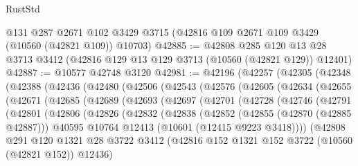 \begin{lexlean}{RustStd}
\begin{coremodule}
    @131
    @287
    @2671
    @102
    @3429
    @3715
    (@42816 @109 @2671 @109 @3429 (@10560 (@42821 @109)) @10703)
@42885 := @42808
    @285
    @120
    @13
    @28
    @3713
    @3412
    (@42816 @129 @13 @129 @3713 (@10560 (@42821 @129)) @12401)
@42887 := @10577 @42748 @3120
@42981 := @42196
    (@42257
      (@42305
        (@42348
          (@42388
            (@42436
              (@42480
                (@42506
                  (@42543
                    (@42576
                      (@42605
                        (@42634
                          (@42655
                            (@42671
                              (@42685
                                (@42689
                                  (@42693
                                    (@42697
                                      (@42701
                                        (@42728
                                          (@42746
                                            (@42791
                                              (@42801
                                                (@42806
                                                  (@42826
                                                    (@42832
                                                      (@42838
                                                        (@42852
                                                          (@42855 (@42870 (@42885 @42887)))
                                                          @40595
                                                          @10764
                                                          @12413
                                                          (@10601 (@12415 @9223 @3418))))
                                                      (@42808
                                                        @291
                                                        @120
                                                        @1321
                                                        @28
                                                        @3722
                                                        @3412
                                                        (@42816
                                                          @152
                                                          @1321
                                                          @152
                                                          @3722
                                                          (@10560 (@42821 @152))
                                                          @12436)

\end{coremodule}
\end{lexlean}
